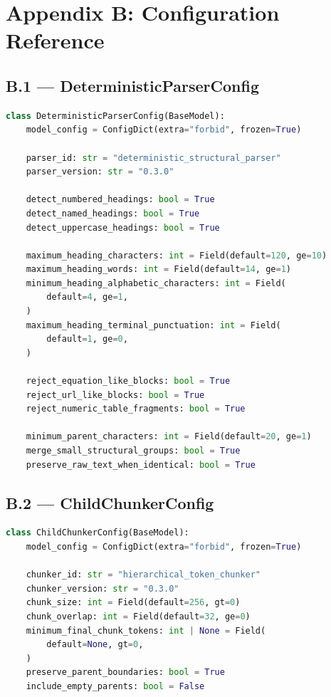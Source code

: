 \documentclass[11pt,a4paper]{article}
\begin{document}
\section{Appendix B: Configuration Reference}

\subsection{B.1 --- DeterministicParserConfig}
\begin{lstlisting}[language=python]
class DeterministicParserConfig(BaseModel):
    model_config = ConfigDict(extra="forbid", frozen=True)

    parser_id: str = "deterministic_structural_parser"
    parser_version: str = "0.3.0"

    detect_numbered_headings: bool = True
    detect_named_headings: bool = True
    detect_uppercase_headings: bool = True

    maximum_heading_characters: int = Field(default=120, ge=10)
    maximum_heading_words: int = Field(default=14, ge=1)
    minimum_heading_alphabetic_characters: int = Field(
        default=4, ge=1,
    )
    maximum_heading_terminal_punctuation: int = Field(
        default=1, ge=0,
    )

    reject_equation_like_blocks: bool = True
    reject_url_like_blocks: bool = True
    reject_numeric_table_fragments: bool = True

    minimum_parent_characters: int = Field(default=20, ge=1)
    merge_small_structural_groups: bool = True
    preserve_raw_text_when_identical: bool = True
\end{lstlisting}

\subsection{B.2 --- ChildChunkerConfig}
\begin{lstlisting}[language=python]
class ChildChunkerConfig(BaseModel):
    model_config = ConfigDict(extra="forbid", frozen=True)

    chunker_id: str = "hierarchical_token_chunker"
    chunker_version: str = "0.3.0"
    chunk_size: int = Field(default=256, gt=0)
    chunk_overlap: int = Field(default=32, ge=0)
    minimum_final_chunk_tokens: int | None = Field(
        default=None, gt=0,
    )
    preserve_parent_boundaries: bool = True
    include_empty_parents: bool = False
\end{lstlisting}
\end{document}
